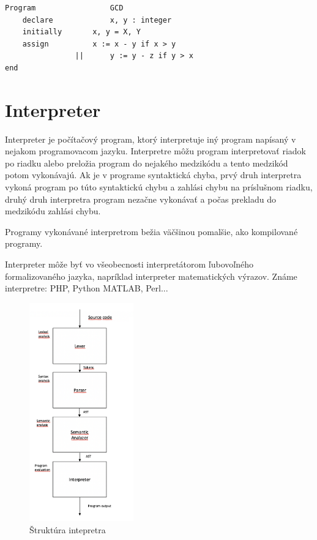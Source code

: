 \begin{lstlisting}
Program 				GCD
	declare 			x, y : integer
	initially	 	x, y = X, Y
	assign 			x := x - y if x > y
				||		y := y - z if y > x
end
\end{lstlisting}

\section{Interpreter}
Interpreter je počítačový program, ktorý interpretuje iný program napísaný 
v nejakom programovacom jazyku. Interpretre môžu program interpretovať riadok 
po riadku alebo preložia program do nejakého medzikódu a tento medzikód potom vykonávajú. 
Ak je v programe syntaktická chyba, prvý druh interpretra vykoná program po túto syntaktickú 
chybu a zahlási chybu na príslušnom riadku, druhý druh interpretra program nezačne vykonávať a
počas prekladu do medzikódu zahlási chybu.

Programy vykonávané interpretrom bežia väčšinou pomalšie, ako kompilované programy.

Interpreter môže byť vo všeobecnosti interpretátorom ľubovoľného formalizovaného jazyka, 
napríklad interpreter matematických výrazov. Známe interpretre: PHP, Python MATLAB, Perl...

\begin{figure}[h]
\centerline{\includegraphics[width=0.4\textwidth]{images/intepreter}}
\caption[intepreter]{Štruktúra intepretra}
\label{obr:intepreter}
\end{figure}

